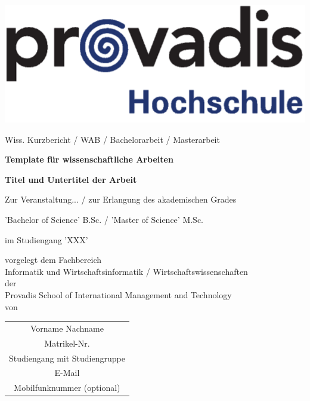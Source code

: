 \begin{titlepage}

    \vspace*{-1cm}
    \noindent
    \begin{minipage}[t]{0.35\textwidth}
        \includegraphics[width=\textwidth]{figures/image1.png}
    \end{minipage}

    \begin{center}
        \vspace{1.5cm}

        Wiss. Kurzbericht / WAB / Bachelorarbeit / Masterarbeit

        \vspace{1cm}
        {\Large\textbf{Template für wissenschaftliche Arbeiten}}

        {\Large\textbf{Titel und Untertitel der Arbeit}}

        \vspace{2cm}
        Zur Veranstaltung... / zur Erlangung des akademischen Grades

        'Bachelor of Science' B.Sc. / 'Master of Science' M.Sc.

        {im Studiengang 'XXX'}

        \vspace{1cm}
        {vorgelegt dem Fachbereich\\
        Informatik und Wirtschaftsinformatik / Wirtschaftswissenschaften\\
        der\\
        Provadis School of International Management and Technology}\\
        {von}

        \vspace{1.5cm}
        \begin{tabular}{c}
        Vorname Nachname\\
        Matrikel-Nr.\\
        Studiengang mit Studiengruppe\\
        E-Mail\\
        Mobilfunknummer (optional)
        \end{tabular}
    \end{center}


\end{titlepage}
